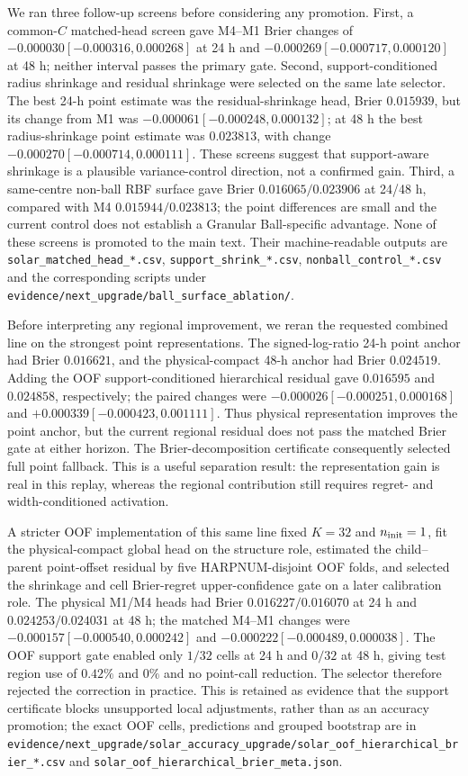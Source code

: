 \documentclass[11pt,a4paper]{article}
\numberwithin{equation}{section}
\theoremstyle{definition}\newtheorem{definition}[theorem]{Definition}
\theoremstyle{remark}\newtheorem{remark}[theorem]{Remark}
\begin{document}
We ran three follow-up screens before considering any promotion. First, a common-$C$ matched-head screen gave M4--M1 Brier changes of $-0.000030[-0.000316,0.000268]$ at 24 h and $-0.000269[-0.000717,0.000120]$ at 48 h; neither interval passes the primary gate. Second, support-conditioned radius shrinkage and residual shrinkage were selected on the same late selector. The best 24-h point estimate was the residual-shrinkage head, Brier $0.015939$, but its change from M1 was $-0.000061[-0.000248,0.000132]$; at 48 h the best radius-shrinkage point estimate was $0.023813$, with change $-0.000270[-0.000714,0.000111]$. These screens suggest that support-aware shrinkage is a plausible variance-control direction, not a confirmed gain. Third, a same-centre non-ball RBF surface gave Brier $0.016065/0.023906$ at 24/48 h, compared with M4 $0.015944/0.023813$; the point differences are small and the current control does not establish a Granular Ball-specific advantage. None of these screens is promoted to the main text. Their machine-readable outputs are \texttt{solar\_matched\_head\_*.csv}, \texttt{support\_shrink\_*.csv}, \texttt{nonball\_control\_*.csv} and the corresponding scripts under \texttt{evidence/next\_upgrade/ball\_surface\_ablation/}.

Before interpreting any regional improvement, we reran the requested combined line on the strongest point representations. The signed-log-ratio 24-h point anchor had Brier $0.016621$, and the physical-compact 48-h anchor had Brier $0.024519$. Adding the OOF support-conditioned hierarchical residual gave $0.016595$ and $0.024858$, respectively; the paired changes were $-0.000026[-0.000251,0.000168]$ and $+0.000339[-0.000423,0.001111]$. Thus physical representation improves the point anchor, but the current regional residual does not pass the matched Brier gate at either horizon. The Brier-decomposition certificate consequently selected full point fallback. This is a useful separation result: the representation gain is real in this replay, whereas the regional contribution still requires regret- and width-conditioned activation.

A stricter OOF implementation of this same line fixed $K=32$ and $n_{\rm init}=1$, fit the physical-compact global head on the structure role, estimated the child--parent point-offset residual by five HARPNUM-disjoint OOF folds, and selected the shrinkage and cell Brier-regret upper-confidence gate on a later calibration role. The physical M1/M4 heads had Brier $0.016227/0.016070$ at 24 h and $0.024253/0.024031$ at 48 h; the matched M4--M1 changes were $-0.000157[-0.000540,0.000242]$ and $-0.000222[-0.000489,0.000038]$. The OOF support gate enabled only $1/32$ cells at 24 h and $0/32$ at 48 h, giving test region use of $0.42\%$ and $0\%$ and no point-call reduction. The selector therefore rejected the correction in practice. This is retained as evidence that the support certificate blocks unsupported local adjustments, rather than as an accuracy promotion; the exact OOF cells, predictions and grouped bootstrap are in \texttt{evidence/next\_upgrade/solar\_accuracy\_upgrade/solar\_oof\_hierarchical\_brier\_*.csv} and \texttt{solar\_oof\_hierarchical\_brier\_meta.json}.
\end{document}
